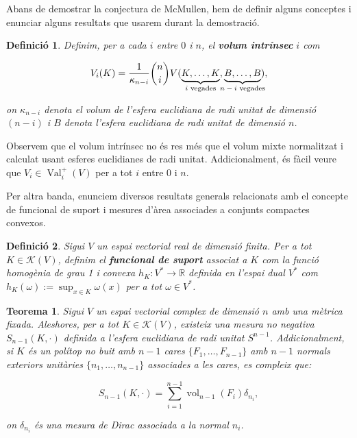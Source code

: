 \documentclass{article}
\newtheorem{teorema}{Teorema}
\newtheorem{definicio}{Definici\'{o}}
\theoremstyle{definition}
\DeclareMathOperator{\Val}{Val}
\DeclareMathOperator{\vol}{vol}
\begin{document}
Abans de demostrar la conjectura de McMullen, hem de definir alguns conceptes i enunciar alguns resultats que usarem durant la demostraci\'{o}.

\begin{definicio}
Definim, per a cada $i$ entre $0$ i $n$, el \textbf{volum intr\'{i}nsec} $i$
com

\[ V_i(K) = \frac{1}{\kappa_{n-i}} \binom{n}{i} V(\underbrace{K, \dots, K}_{\text{$i$ vegades}}, \underbrace{B, \dots, B}_{\mathclap{\text{$n - i$ vegades}}}),\]

on $\kappa_{n - i}$ denota el volum de l'esfera euclidiana de radi unitat de dimensi\'{o} $(n - i)$ i $B$ denota l'esfera euclidiana de radi unitat de dimensi\'{o} $n$.
\end{definicio}

Observem que el volum intr\'{i}nsec no \'{e}s res m\'{e}s que el volum mixte normalitzat i calculat usant esferes euclidianes de radi unitat. Addicionalment, \'{e}s f\`{a}cil veure que $V_i \in \Val_i^+(V)$ per a tot $i$ entre $0$ i $n$.

Per altra banda, enunciem diversos resultats generals relacionats amb el concepte de funcional de suport i mesures d'\`{a}rea associades a conjunts compactes convexos.

\begin{definicio}
Sigui $V$ un espai vectorial real de dimensi\'{o} finita. Per a tot $K \in \mathcal{K}(V)$, definim el \textbf{funcional de suport} associat a $K$ com la funci\'{o} homog\`{e}nia de grau 1 i convexa $h_K: V^{*} \longrightarrow \mathbb{R}$ definida en l'espai dual $V^{*}$ com $h_K (\omega) := \sup_{x \in K} \omega(x)$ per a tot $\omega \in V^{*}$.
\end{definicio}

\begin{teorema} \label{teo:s}
Sigui $V$ un espai vectorial complex de dimensi\'{o} $n$ amb una m\`{e}trica fixada. Aleshores, per a tot $K \in \mathcal{K}(V)$, existeix una mesura no negativa $S_{n-1}(K, \cdot)$ definida a l'esfera euclidiana de radi unitat $S^{n-1}$. Addicionalment, si $K$ \'{e}s un pol\'{i}top no buit amb $n-1$ cares $\{ F_1, \dots, F_{n-1}\}$ amb $n-1$ normals exteriors unit\`{a}ries $\{ n_1, \dots, n_{n-1}\}$ associades a les cares, es compleix que:

\[ S_{n-1}(K, \cdot) = \sum_{i=1}^{n-1} \vol_{n-1} (F_i) \delta_{n_i},\]

on $\delta_{n_i}$ \'{e}s una mesura de Dirac associada a la normal $n_i$.

\end{teorema}
\end{document}
